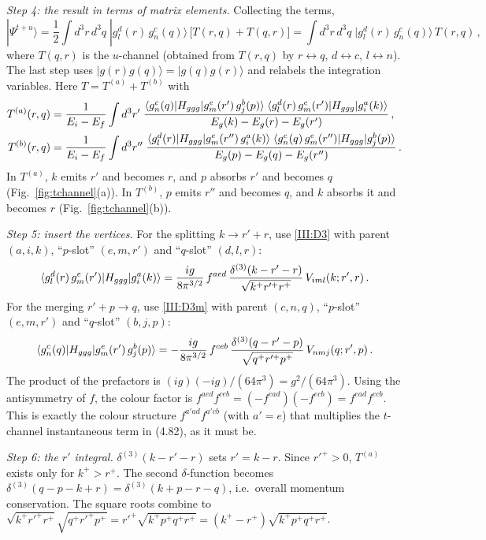 \emph{Step 4: the result in terms of matrix elements.} Collecting the terms,
\begin{equation}
|\Psi^{t+u}\rangle=\frac12\int d^3r\,d^3q\;|g^d_l(r)\,g^c_n(q)\rangle\,\big[T(r,q)+T(q,r)\big]=\int d^3r\,d^3q\;|g^d_l(r)\,g^c_n(q)\rangle\,T(r,q)\,,
\label{III:psi}
\end{equation}
where $T(q,r)$ is the $u$-channel (obtained from $T(r,q)$ by $r\leftrightarrow q$, $d\leftrightarrow c$, $l\leftrightarrow n$). The last step uses $|g(r)g(q)\rangle=|g(q)g(r)\rangle$ and relabels the integration variables. Here $T=T^{(a)}+T^{(b)}$ with
\begin{align}
T^{(a)}(r,q)&=\frac{1}{E_i-E_f}\int d^3r'\;\frac{\langle g^c_n(q)|H_{ggg}|g^e_m(r')\,g^b_j(p)\rangle\;\langle g^d_l(r)\,g^e_m(r')|H_{ggg}|g^a_i(k)\rangle}{E_g(k)-E_g(r)-E_g(r')}\,,
\label{III:Ta}\\
T^{(b)}(r,q)&=\frac{1}{E_i-E_f}\int d^3r''\;\frac{\langle g^d_l(r)|H_{ggg}|g^e_m(r'')\,g^a_i(k)\rangle\;\langle g^c_n(q)\,g^e_m(r'')|H_{ggg}|g^b_j(p)\rangle}{E_g(p)-E_g(q)-E_g(r'')}\,.
\label{III:Tb}
\end{align}
In $T^{(a)}$, $k$ emits $r'$ and becomes $r$, and $p$ absorbs $r'$ and becomes $q$ (Fig.~\ref{fig:tchannel}(a)). In $T^{(b)}$, $p$ emits $r''$ and becomes $q$, and $k$ absorbs it and becomes $r$ (Fig.~\ref{fig:tchannel}(b)).

\emph{Step 5: insert the vertices.} For the splitting $k\to r'+r$, use \eqref{III:D3} with parent $(a,i,k)$, ``$p$-slot'' $(e,m,r')$ and ``$q$-slot'' $(d,l,r)$:
\[
\langle g^d_l(r)\,g^e_m(r')|H_{ggg}|g^a_i(k)\rangle=\frac{ig}{8\pi^{3/2}}\,f^{aed}\,\frac{\delta^{(3)}(k-r'-r)}{\sqrt{k^+r'^+r^+}}\,V_{iml}(k;r',r)\,.
\]
For the merging $r'+p\to q$, use \eqref{III:D3m} with parent $(c,n,q)$, ``$p$-slot'' $(e,m,r')$ and ``$q$-slot'' $(b,j,p)$:
\[
\langle g^c_n(q)|H_{ggg}|g^e_m(r')\,g^b_j(p)\rangle=-\frac{ig}{8\pi^{3/2}}\,f^{ceb}\,\frac{\delta^{(3)}(q-r'-p)}{\sqrt{q^+r'^+p^+}}\,V_{nmj}(q;r',p)\,.
\]
The product of the prefactors is $(ig)(-ig)/(64\pi^3)=g^2/(64\pi^3)$. Using the antisymmetry of $f$, the colour factor is $f^{aed}f^{ceb}=(-f^{ead})(-f^{ecb})=f^{ead}f^{ecb}$. This is exactly the colour structure $f^{a'ad}f^{a'cb}$ (with $a'=e$) that multiplies the $t$-channel instantaneous term in (4.82), as it must be.

\emph{Step 6: the $r'$ integral.} $\delta^{(3)}(k-r'-r)$ sets $r'=k-r$. Since $r'^+>0$, $T^{(a)}$ exists only for $k^+>r^+$. The second $\delta$-function becomes $\delta^{(3)}(q-p-k+r)=\delta^{(3)}(k+p-r-q)$, i.e.\ overall momentum conservation. The square roots combine to $\sqrt{k^+r'^+r^+}\sqrt{q^+r'^+p^+}=r'^+\sqrt{k^+p^+q^+r^+}=(k^+-r^+)\sqrt{k^+p^+q^+r^+}$.

